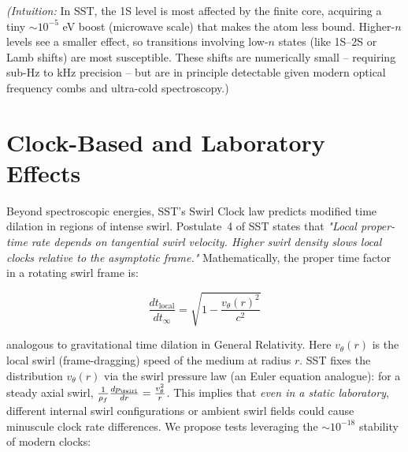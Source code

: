 \documentclass[11pt]{article}
\begin{document}
\textit{(Intuition:} In SST, the 1S level is most affected by the finite core, acquiring a tiny $\sim10^{-5}$ eV boost (microwave scale) that makes the atom less bound. Higher-$n$ levels see a smaller effect, so transitions involving low-$n$ states (like 1S--2S or Lamb shifts) are most susceptible. These shifts are numerically small -- requiring sub-Hz to kHz precision -- but are in principle detectable given modern optical frequency combs and ultra-cold spectroscopy.)


\section*{Clock-Based and Laboratory Effects}

Beyond spectroscopic energies, SST's Swirl Clock law predicts modified time dilation in regions of intense swirl. Postulate~4 of SST states that \textit{"Local proper-time rate depends on tangential swirl velocity. Higher swirl density slows local clocks relative to the asymptotic frame."} Mathematically, the proper time factor in a rotating swirl frame is:

\begin{equation}
\frac{dt_{\text{local}}}{dt_{\infty}} = \sqrt{1 - \frac{v_{\theta}(r)^2}{c^2}}
\tag{Swirl Clock law}
\label{clock_law}
\end{equation}

analogous to gravitational time dilation in General Relativity. Here $v_\theta(r)$ is the local swirl (frame-dragging) speed of the medium at radius $r$. SST fixes the distribution $v_\theta(r)$ via the swirl pressure law (an Euler equation analogue): for a steady axial swirl, $\frac{1}{\rho_f}\frac{dp_{\swirl}}{dr} = \frac{v_\theta^2}{r}$. This implies that \textit{even in a static laboratory}, different internal swirl configurations or ambient swirl fields could cause minuscule clock rate differences. We propose tests leveraging the $\sim 10^{-18}$ stability of modern clocks:
\end{document}
